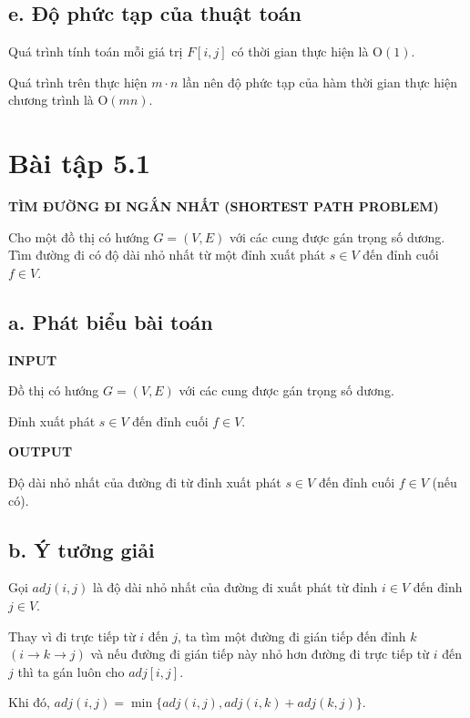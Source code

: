 \documentclass[12pt, a4paper, fleqn]{article}
\begin{document}
	\subsection*{e. Độ phức tạp của thuật toán}
	
	Quá trình tính toán mỗi giá trị $F[i, j]$ có thời gian thực hiện là O$(1)$.
	
	Quá trình trên thực hiện $m \cdot n$ lần nên độ phức tạp của hàm thời gian thực hiện chương trình là O$(mn)$.

	\clearpage
	
	\section*{Bài tập 5.1}
	
	
	\textbf{TÌM ĐƯỜNG ĐI NGẮN NHẤT (SHORTEST PATH PROBLEM)}
	
	Cho một đồ thị có hướng $G = (V, E)$ với các cung được gán trọng số dương. Tìm đường đi có độ dài nhỏ nhất từ một đỉnh xuất phát $s \in V$ đến đỉnh cuối $f \in V$.
	
	\subsection*{a. Phát biểu bài toán}
	
	\textbf{INPUT}
	
	Đồ thị có hướng $G = (V, E)$ với các cung được gán trọng số dương.
	
	Đỉnh xuất phát $s \in V$ đến đỉnh cuối $f \in V$.
	
	\textbf{OUTPUT}
	
	Độ dài nhỏ nhất của đường đi từ đỉnh xuất phát $s \in V$ đến đỉnh cuối $f \in V$ (nếu có).
	
	\subsection*{b. Ý tưởng giải}
	
	Gọi $adj(i, j)$ là độ dài nhỏ nhất của đường đi xuất phát từ đỉnh $i \in V$ đến đỉnh $j \in V$.
	
	Thay vì đi trực tiếp từ $i$ đến $j$, ta tìm một đường đi gián tiếp đến đỉnh $k$ $(i \rightarrow k \rightarrow j)$ và nếu đường đi gián tiếp này nhỏ hơn đường đi trực tiếp từ $i$ đến $j$ thì ta gán luôn cho $adj[i, j]$.
	
	Khi đó, $adj(i, j) = \min\{adj(i, j), adj(i, k) + adj(k, j)\}$.
	
\end{document}
